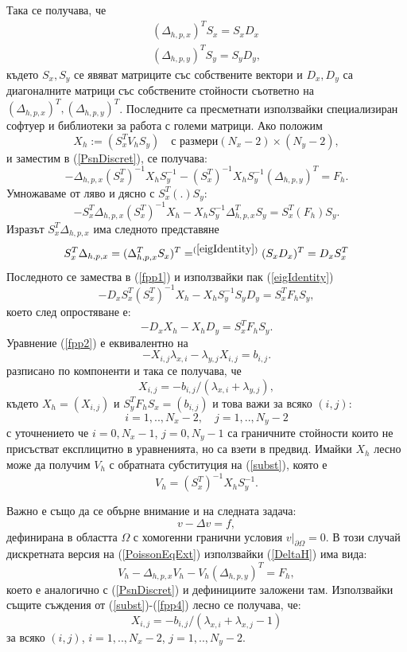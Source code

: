 \documentclass{article}
\newcommand{\be}{\begin{equation}}
\newcommand{\ee}{\end{equation}}
\newcommand{\rf}[1]{(\ref{#1})}
\begin{document}
Така се получава, че
\begin{align}\label{eigIdentity}
(\Delta_{h,p,x})^T  S_x = S_x  D_x\nonumber\\
(\Delta_{h,p,y})^T   S_y = S_y  D_y,
\end{align}
където $S_x, S_y$ се явяват матриците със собствените вектори и $D_x, D_y$ са диагоналните матрици със собствените стойности съответно на $(\Delta_{h,p,x})^T, (\Delta_{h,p,y})^T$. Последните са пресметнати използвайки специализиран софтуер и библиотеки за работа с големи матрици. Ако положим
\be\label{subst}
X_h := ( S_x^T  V_h  S_y ) \quad \text{с размери} (N_x-2)\times(N_y-2),
\ee
и заместим в \rf{PsnDiscret}, се получава:
\be
-\Delta_{h,p,x}  (S_x^T)^{-1} X_h  S_y^{-1}  -(S_x^T)^{-1} X_h  S_y^{-1}  (\Delta_{h,p,y})^T = F_h.
\ee
Умножаваме от ляво и дясно с $ S_x^T  ( . )  S_y$:
\be\label{fpp1}
- S_x^T \Delta_{h,p,x} (S_x^T)^{-1} X_h -X_h  S_y^{-1}  \Delta_{h,p,x}^T  S_y = S_x^T  ( F_h )  S_y.
\ee
Изразът $S_x^T  \Delta_{h,p,x}$ има следното представяне
\be
S_x^T  \Delta_{h,p,x} = (\Delta_{h,p,x}^T  S_x)^T =^{\rf{eigIdentity}} (S_x  D_x)^T = D_x  S_x^T
\ee
Последното се замества в \rf{fpp1} и използвайки пак \rf{eigIdentity}
\be\label{fpp2}
- D_x  S_x^T (S_x^T)^{-1} X_h  -X_h  S_y^{-1}  S_y  D_y = S_x^T  F_h   S_y,
\ee
което след опростяване е:
\be\label{fpp2}
- D_x  X_h -X_h  D_y = S_x^T  F_h  S_y.
\ee
Уравнение \rf{fpp2} е еквивалентно на
\be\label{fpp3}
-X_{i,j} \lambda_{x,i} - \lambda_{y,j} X_{i,j} = b_{i,j}.
\ee
разписано по компоненти и така се получава, че
\be\label{fpp4}
X_{i,j} = - b_{i,j}/(\lambda_{x,i} + \lambda_{y,j} ),
\ee
където $X_h = (X_{i,j})$ и $S_y^T  F_h   S_x = (b_{i,j})$ и това важи за всяко $(i,j)$:
$$i = 1,..,N_x-2, \quad j = 1,..,N_y-2 $$
с уточнението че $i = 0,N_x-1$, $j = 0,N_y-1$ са граничните стойности които не присъстват експлицитно в уравненията, но са взети в предвид. Имайки $X_h$ лесно може да получим $V_h$  с обратната субституция на \rf{subst}, която е 
\be\label{substInv}
V_h = (S_x^T)^{-1}  X_h  S_y^{-1}.
\ee

Важно е също да се обърне внимание и на следната задача:
\be\label{PoissonEqExt}
v-\Delta v = f,
\ee
дефинирана в областта $\Omega$ с хомогенни гранични условия $v \big|_{\partial\Omega} = 0$. В този случай дискретната версия на \rf{PoissonEqExt} използвайки \rf{DeltaH} има вида:
\be\label{PsnDiscretExt}
V_h - \Delta_{h,p,x}  V_h - V_h  (\Delta_{h,p,y}) ^{T}  = F_h,
\ee
което е аналогично с \rf{PsnDiscret} и дефинициите заложени там. Използвайки същите съждения от \rf{subst}-\rf{fpp4} лесно се получава, че:
\be\label{fpp4Ext}
X_{i,j} = - b_{i,j}/(\lambda_{x,i}  + \lambda_{x,j} -1)
\ee
за всяко $(i,j)$, $i = 1,..,N_x-2$, $j = 1,..,N_y-2 $.
\end{document}
